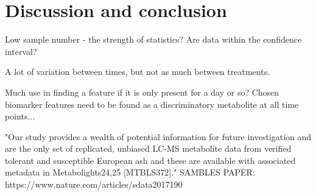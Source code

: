 



\newpage
\section{Discussion and conclusion}

Low sample number - the strength of statistics? Are data within the confidence interval? 

A lot of variation between times, but not as much between treatments. 

Much use in finding a feature if it is only present for a day or so? Chosen biomarker features need to be found as a discriminatory metabolite at all time points...


"Our study provides a wealth of potential information for future investigation and are the only set of replicated, unbiased LC-MS metabolite data from verified tolerant and susceptible European ash and these are available with associated metadata in Metabolights24,25 [MTBLS372]." SAMBLES PAPER: https://www.nature.com/articles/sdata2017190